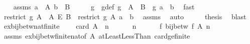 \begin{isabellebody}
%
\endisadelimproof
%
\isatagproof
{}\isamarkupfalse%
{\isacharminus}{\kern0pt}\isanewline
\ \ \isamarkupfalse%
\ assms{\isacharcolon}{\kern0pt}\ {\isachardoublequoteopen}a\ {\isasymin}\ A{\isachardoublequoteclose}\ {\isachardoublequoteopen}b\ {\isasymin}\ B{\isachardoublequoteclose}\isanewline
\ \ \isamarkupfalse%
\ \isamarkupfalse%
\ g\ \ g{\isacharunderscore}{\kern0pt}def{\isacharcolon}{\kern0pt}\ {\isachardoublequoteopen}g\ {\isasymin}\ A\ {\isasymrightarrow}\ B\ {\isasymand}\ g\ a\ {\isacharequal}{\kern0pt}\ b{\isachardoublequoteclose}\ \isamarkupfalse%
\ fast\isanewline
\ \ \isamarkupfalse%
\ \isamarkupfalse%
\ {\isachardoublequoteopen}restrict\ g\ A\ {\isasymin}\ A\ {\isasymrightarrow}\isactrlsub E\ B\ {\isasymand}\ {\isacharparenleft}{\kern0pt}restrict\ g\ A{\isacharparenright}{\kern0pt}\ a\ {\isacharequal}{\kern0pt}\ b{\isachardoublequoteclose}\ \isamarkupfalse%
\ assms{\isacharparenleft}{\kern0pt}{}{\isacharparenright}{\kern0pt}\ \isamarkupfalse%
\ auto\isanewline
\ \ \isamarkupfalse%
\ \isamarkupfalse%
\ {\isacharquery}{\kern0pt}thesis\ \isamarkupfalse%
\ blast\isanewline
{}\isamarkupfalse%
%
\endisatagproof
{\isafoldproof}%
%
\isadelimproof
\isanewline
%
\endisadelimproof
\isanewline
{}\isamarkupfalse%
\ ex{\isacharunderscore}{\kern0pt}bij{\isacharunderscore}{\kern0pt}betw{\isacharunderscore}{\kern0pt}nat{\isacharunderscore}{\kern0pt}finite{\isacharunderscore}{\kern0pt}{}{\isacharcolon}{\kern0pt}\ \isanewline
\ \ \ {\isachardoublequoteopen}card\ A\ {\isacharequal}{\kern0pt}\ n{\isachardoublequoteclose}\ \isanewline
\ \ \ \ \ {\isachardoublequoteopen}n\ {\isachargreater}{\kern0pt}\ {}{\isachardoublequoteclose}\ \isanewline
\ \ \ {\isachardoublequoteopen}{\isasymexists}f{\isachardot}{\kern0pt}\ bij{\isacharunderscore}{\kern0pt}betw\ f\ A\ {\isacharbraceleft}{\kern0pt}{\isachardot}{\kern0pt}{\isachardot}{\kern0pt}{\isacharless}{\kern0pt}n{\isacharbraceright}{\kern0pt}{\isachardoublequoteclose}\isanewline
%
\isadelimproof
\ \ %
\endisadelimproof
%
\isatagproof
{}\isamarkupfalse%
\ assms\ ex{\isacharunderscore}{\kern0pt}bij{\isacharunderscore}{\kern0pt}betw{\isacharunderscore}{\kern0pt}finite{\isacharunderscore}{\kern0pt}nat{\isacharbrackleft}{\kern0pt}of\ A{\isacharbrackright}{\kern0pt}\ atLeast{}LessThan\ card{\isacharunderscore}{\kern0pt}ge{\isacharunderscore}{\kern0pt}{}{\isacharunderscore}{\kern0pt}finite\ \isamarkupfalse%

\end{isabellebody}
